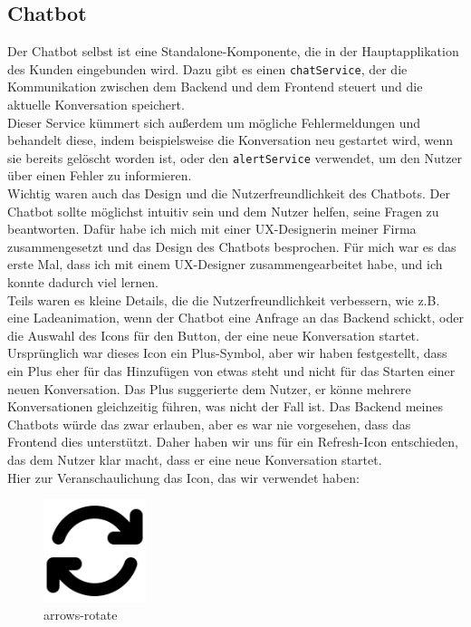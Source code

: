 \pagebreak
\subsection{Chatbot}\label{sec:umsetzung_chatbot}
Der Chatbot selbst ist eine Standalone-Komponente, die in der Hauptapplikation des Kunden eingebunden wird. Dazu gibt es einen \lstinline|chatService|,  
der die Kommunikation zwischen dem Backend und dem Frontend steuert und die aktuelle Konversation speichert.\\  
Dieser Service kümmert sich außerdem um mögliche Fehlermeldungen und behandelt diese, indem beispielsweise die Konversation neu gestartet wird, wenn sie  
bereits gelöscht worden ist, oder den \lstinline|alertService| verwendet, um den Nutzer über einen Fehler zu informieren.\\  
Wichtig waren auch das Design und die Nutzerfreundlichkeit des Chatbots. Der Chatbot sollte möglichst intuitiv sein und dem Nutzer helfen, seine Fragen zu beantworten.  
Dafür habe ich mich mit einer UX-Designerin meiner Firma zusammengesetzt und das Design des Chatbots besprochen.  
Für mich war es das erste Mal, dass ich mit einem UX-Designer zusammengearbeitet habe, und ich konnte dadurch viel lernen.\\  
Teils waren es kleine Details, die die Nutzerfreundlichkeit verbessern, wie z.B. eine Ladeanimation, wenn der Chatbot eine Anfrage an das Backend schickt,  
oder die Auswahl des Icons für den Button, der eine neue Konversation startet.\\  
Ursprünglich war dieses Icon ein Plus-Symbol, aber wir haben festgestellt, dass ein Plus eher für das Hinzufügen von etwas steht und nicht für das Starten einer neuen Konversation.  
Das Plus suggerierte dem Nutzer, er könne mehrere Konversationen gleichzeitig führen, was nicht der Fall ist.  
Das Backend meines Chatbots würde das zwar erlauben, aber es war nie vorgesehen, dass das Frontend dies unterstützt.  
Daher haben wir uns für ein Refresh-Icon entschieden, das dem Nutzer klar macht, dass er eine neue Konversation startet.\\  

Hier zur Veranschaulichung das Icon, das wir verwendet haben: \cite{fontawesome:refresh}\\  
\begin{figure}[H]
    \begin{center}
        \includegraphics[width=3cm]{bilder/arrows-rotate-solid.png}
        \caption{arrows-rotate}\label{fig:refresh_fontawesome}
    \end{center}
\end{figure}